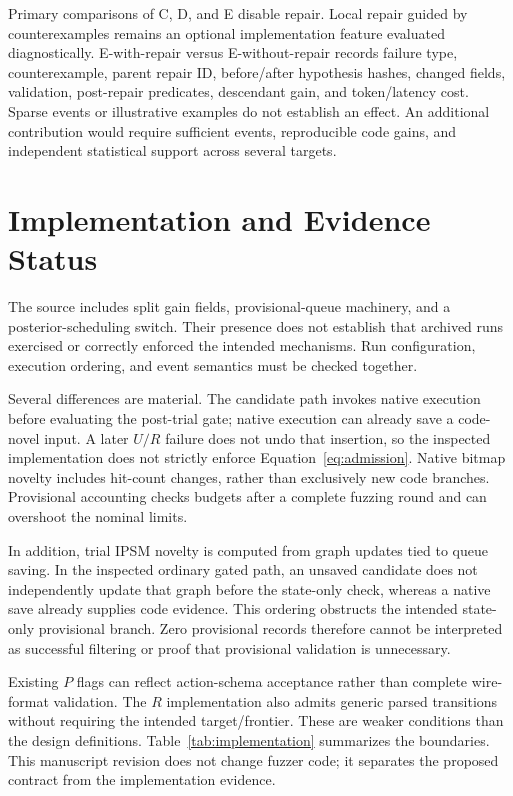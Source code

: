 \documentclass[final,5p,times,number]{elsarticle}
\begin{document}
Primary comparisons of C, D, and E disable repair. Local repair guided by counterexamples remains an optional implementation feature evaluated diagnostically. E-with-repair versus E-without-repair records failure type, counterexample, parent repair ID, before/after hypothesis hashes, changed fields, validation, post-repair predicates, descendant gain, and token/latency cost. Sparse events or illustrative examples do not establish an effect. An additional contribution would require sufficient events, reproducible code gains, and independent statistical support across several targets.


\section{Implementation and Evidence Status}
\label{sec:implementation}
The source includes split gain fields, provisional-queue machinery, and a posterior-scheduling switch. Their presence does not establish that archived runs exercised or correctly enforced the intended mechanisms. Run configuration, execution ordering, and event semantics must be checked together.

Several differences are material. The candidate path invokes native execution before evaluating the post-trial gate; native execution can already save a code-novel input. A later $U/R$ failure does not undo that insertion, so the inspected implementation does not strictly enforce Equation~\ref{eq:admission}. Native bitmap novelty includes hit-count changes, rather than exclusively new code branches. Provisional accounting checks budgets after a complete fuzzing round and can overshoot the nominal limits.

In addition, trial IPSM novelty is computed from graph updates tied to queue saving. In the inspected ordinary gated path, an unsaved candidate does not independently update that graph before the state-only check, whereas a native save already supplies code evidence. This ordering obstructs the intended state-only provisional branch. Zero provisional records therefore cannot be interpreted as successful filtering or proof that provisional validation is unnecessary.

Existing $P$ flags can reflect action-schema acceptance rather than complete wire-format validation. The $R$ implementation also admits generic parsed transitions without requiring the intended target/frontier. These are weaker conditions than the design definitions. Table~\ref{tab:implementation} summarizes the boundaries. This manuscript revision does not change fuzzer code; it separates the proposed contract from the implementation evidence.
\end{document}
